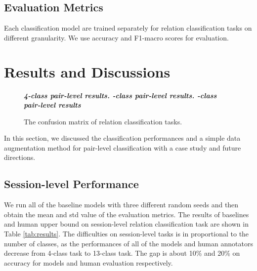 \documentclass[letterpaper]{article} \usepackage{aaai21}  \usepackage{times}  \usepackage{helvet} \usepackage{courier}  \usepackage[hyphens]{url}  \usepackage{graphicx} \usepackage{xcolor}
\begin{document}
\subsection{Evaluation Metrics}
\label{sec:metrics}
Each classification model are trained separately for relation classification tasks on different granularity. We use accuracy and F1-macro scores for evaluation.



 
\section{Results and Discussions}
\label{sec:results}

\begin{figure*}
	\centering
	\textbf{\em  4-class pair-level results. \quad\quad {}-class pair-level results.    \quad      \quad{}-class pair-level results}\vspace{-1.0cm}\\
	\vspace{-1cm}
	\caption{The confusion matrix of relation classification tasks.}
	\label{fig:confusion}
\end{figure*}
In this section, we discussed the classification performances and a simple data augmentation method for pair-level classification with a case study and future directions.
\subsection{Session-level Performance}
We run all of the baseline models with three different random seeds and then obtain the mean and
std value of the evaluation metrics. The results of baselines and human upper bound on session-level relation classification task 
are shown in Table \ref{tab:results}. The difficulties on session-level tasks is in proportional to the number of classes, as the performances of all of the models and human annotators decrease from 4-class task to 13-class task. The gap is about 10\% and 20\% on accuracy for models and human evaluation respectively. 
\end{document}
